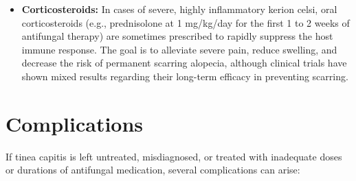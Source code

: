 \begin{itemize}
    \item \textbf{Corticosteroids:} In cases of severe, highly inflammatory kerion celsi, oral corticosteroids (e.g., prednisolone at 1 mg/kg/day for the first 1 to 2 weeks of antifungal therapy) are sometimes prescribed to rapidly suppress the host immune response. The goal is to alleviate severe pain, reduce swelling, and decrease the risk of permanent scarring alopecia, although clinical trials have shown mixed results regarding their long-term efficacy in preventing scarring.
\end{itemize}

\section*{Complications}
If tinea capitis is left untreated, misdiagnosed, or treated with inadequate doses or durations of antifungal medication, several complications can arise:
